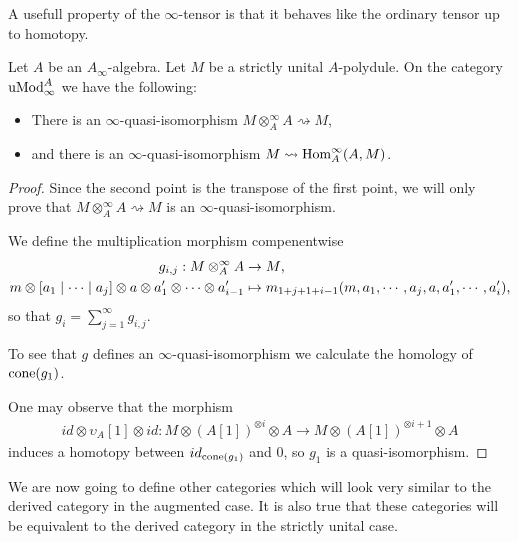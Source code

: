 \documentclass[../thesis.tex]{subfiles}
\begin{document}
            A usefull property of the $\infty$-tensor is that it behaves like the ordinary tensor up to homotopy.

            \begin{lemma}\label{lem: tensor-hom-qiso}
                Let $A$ be an $A_\infty$-algebra. Let $M$ be a strictly unital $A$-polydule. On the category $\tt{uMod}_\infty^A$ we have the following:
                \begin{itemize}
                    \item There is an $\infty$-quasi-isomorphism $M \otimes_A^\infty A \rightsquigarrow M$,
                    \item and there is an $\infty$-quasi-isomorphism $M \rightsquigarrow \tt{Hom}_A^\infty(A,M)$.
                \end{itemize}
            \end{lemma}

            \begin{proof}
                Since the second point is the transpose of the first point, we will only prove that $M \otimes_A^\infty A \rightsquigarrow M$ is an $\infty$-quasi-isomorphism.

                We define the multiplication morphism compenentwise
                \begin{align*}
                    g_{i,j} : M \otimes_A^\infty A & \rightarrow M\tt{,} \\
                    m \otimes [a_1\mid \cdots \mid a_{j}] \otimes a \otimes a'_1 \otimes \cdots \otimes a'_{i-1} & \mapsto m_{1+j+1+i-1}(m,a_1,\cdots,a_j,a,a'_1,\cdots,a'_i)\tt{,}
                \end{align*}
                so that $g_i = \sum_{j=1}^\infty g_{i,j}$.

                To see that $g$ defines an $\infty$-quasi-isomorphism we calculate the homology of $\tt{cone}(g_1)$.

                One may observe that the morphism 
                \begin{align*}
                    id \otimes \upsilon_A[1] \otimes id : M \otimes (A[1])^{\otimes i} \otimes A \rightarrow M \otimes (A[1])^{\otimes i+1} \otimes A
                \end{align*}
                induces a homotopy between $id_{\tt{cone}(g_1)}$ and $0$, so $g_1$ is a quasi-isomorphism.
            \end{proof}

            We are now going to define other categories which will look very similar to the derived category in the augmented case. It is also true that these categories will be equivalent to the derived category in the strictly unital case.
\end{document}
